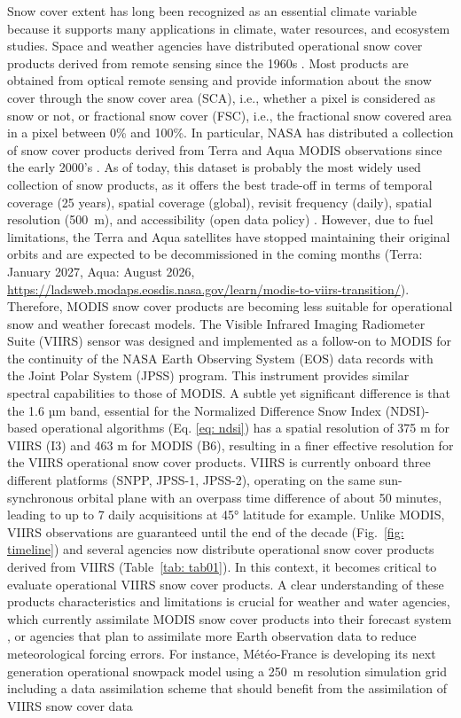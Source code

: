 \documentclass[tc, manuscript]{copernicus}
\begin{document}
Snow cover extent has long been recognized as an essential climate variable because it supports many applications in climate, water resources, and ecosystem studies. Space and weather agencies have distributed operational snow cover products derived from remote sensing since the 1960s \citep{ramsay_interactive_1998}. Most products are obtained from optical remote sensing and provide information about the snow cover through the snow cover area (SCA), i.e., whether a pixel is considered as snow or not, or fractional snow cover (FSC), i.e., the fractional snow covered area in a pixel between 0\% and 100\%. In particular, NASA has distributed a collection of snow cover products derived from Terra and Aqua MODIS observations since the early 2000's \citep{hall_modis_2002}. As of today, this dataset is probably the most widely used collection of snow products, as it offers the best trade-off in terms of temporal coverage (25 years), spatial coverage (global), revisit frequency (daily), spatial resolution (500~m), and accessibility (open data policy) \citep{gascoin_remote_2024}. However, due to fuel limitations, the Terra and Aqua satellites have stopped maintaining their original orbits and are expected to be decommissioned in the coming months (Terra: January 2027, Aqua: August 2026, \url{https://ladsweb.modaps.eosdis.nasa.gov/learn/modis-to-viirs-transition/}). Therefore, MODIS snow cover products are becoming less suitable for  operational snow and weather forecast models. The Visible Infrared Imaging Radiometer Suite (VIIRS) sensor was designed and implemented as a follow-on to MODIS for the continuity of the NASA Earth Observing System (EOS) data records with the Joint Polar System (JPSS) program. This instrument provides similar spectral capabilities to those of MODIS. A subtle yet significant difference is that the 1.6 µm band, essential for the Normalized Difference Snow Index (NDSI)-based operational algorithms (Eq. \ref{eq: ndsi}) has a spatial resolution of 375 m for VIIRS (I3) and 463 m for MODIS (B6), resulting in a finer effective resolution for the VIIRS operational snow cover products. VIIRS is currently onboard three different platforms (SNPP, JPSS-1, JPSS-2), operating on the same sun-synchronous orbital plane \citep{zhou2019OverviewSciencePerformances} with an overpass time difference of about 50 minutes, leading to up to 7 daily acquisitions at 45° latitude for example. Unlike MODIS, VIIRS observations are guaranteed until the end of the decade (Fig.~\ref{fig: timeline}) and several agencies now distribute operational snow cover products derived from VIIRS (Table~\ref{tab: tab01}). In this context, it becomes critical to evaluate operational VIIRS snow cover products. A clear understanding of these products characteristics and limitations is crucial for weather and water agencies, which currently assimilate MODIS snow cover products into their forecast system \citep{ saloranta2016OperationalSnowMapping}, or agencies that plan to assimilate more Earth observation data to reduce meteorological forcing errors. For instance, Météo-France is developing its next generation operational snowpack model using a 250~m resolution simulation grid including a data assimilation scheme that should benefit from the assimilation of VIIRS snow cover data 
\end{document}
